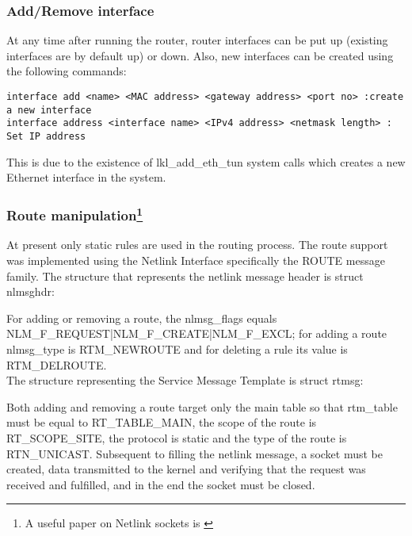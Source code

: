 {{\subsubsection{Add/Remove interface}
At any time after running the router, router interfaces can be put up (existing interfaces are by default up) 
or down. Also, new interfaces can be created using the following commands:
\lstset{language=TeX,caption=Adding a new interface,label=lst:saddrule}
\begin{lstlisting}
interface add <name> <MAC address> <gateway address> <port no> :create a new interface
interface address <interface name> <IPv4 address> <netmask length> : Set IP address 
\end{lstlisting}  
This is due to the existence of lkl_add_eth_tun system calls which creates a new Ethernet interface in the system.
 
\subsubsection[Route manipulation]{Route manipulation\footnote{A useful paper on Netlink sockets is \cite{netlinksockets}}}
At present only static rules are used in the routing process.
The route support was implemented using the Netlink Interface specifically the ROUTE message family.
The structure that represents the netlink message header is struct nlmsghdr:
\lstset{language=C, caption=Netlink Message Header Structure}

For adding or removing a route, the nlmsg_flags equals NLM_F_REQUEST|NLM_F_CREATE|NLM_F_EXCL; for adding a route nlmsg_type is RTM_NEWROUTE and for deleting a rule its value is RTM_DELROUTE.
\\
 
The structure representing the Service Message Template is struct rtmsg:
\lstset{language=C, caption=Service Message Template Structure}


Both adding and removing a route target only the main table so that rtm_table must be equal to RT_TABLE_MAIN, the scope of the route is RT_SCOPE_SITE, the protocol is static and the type of the route is RTN_UNICAST.
Subsequent to filling the netlink message, a socket must be created, data transmitted to the kernel and verifying that the request was received and fulfilled, and in the end the socket must be closed.

\lstset{language=C, caption=Communicating with the kernel}
  

}}
